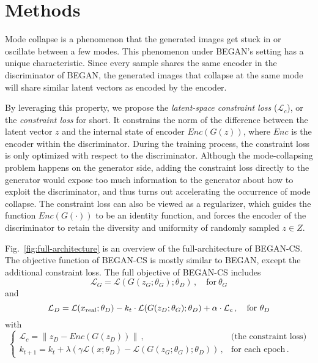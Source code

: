 \documentclass[runningheads]{llncs}
\begin{document}
\section{Methods}

    Mode collapse is a phenomenon that the generated images get stuck in or oscillate between a few modes. This phenomenon under BEGAN's setting has a unique characteristic. Since every sample shares the same encoder in the discriminator of BEGAN, the generated images that collapse at the same mode will share similar latent vectors as encoded by the encoder.
    
    By leveraging this property, we propose the \emph{latent-space constraint loss} ($\mathcal{L}_c$), or the \emph{constraint loss} for short. It constrains the norm of the difference between the latent vector $z$ and the internal state of encoder $Enc(G(z))$, where $Enc$ is the encoder within the discriminator. During the training process, the constraint loss is only optimized with respect to the discriminator. Although the mode-collapsing problem happens on the generator side, adding the constraint loss directly to the generator would expose too much information to the generator about how to exploit the discriminator, and thus turns out accelerating the occurrence of mode collapse. The constraint loss can also be viewed as a regularizer, which guides the function $Enc(G(\cdot))$ to be an identity function, and forces the encoder of the discriminator to retain the diversity and uniformity of randomly sampled $z \in Z$.
    
    
    Fig.~\ref{fig:full-architecture} is an overview of the full-architecture of BEGAN-CS. The objective function of BEGAN-CS is mostly similar to BEGAN, except the additional constraint loss. The full objective of BEGAN-CS includes
    \begin{equation}
    \mathcal{L}_G = \mathcal{L}(G(z_G;\theta_G);\theta_D)\,, \quad  \mbox{for} \ \theta_G 
    \end{equation}
\noindent and
\begin{equation}
        \mathcal{L}_D = \mathcal{L}(x_\mathrm{real};\theta_D) - k_t \cdot \mathcal{L}(G(z_D;\theta_G);\theta_D) +  \alpha \cdot \mathcal{L}_c\,, \quad \mbox{for} \ \theta_D  \\
    \end{equation}
\noindent with
\begin{equation}
    \begin{cases}     
        \mathcal{L}_c = \lVert z_D - Enc(G(z_D)) \rVert \,, & \mbox{(the constraint loss)}\\
    
        k_{t+1} = k_{t} + \lambda (\gamma \mathcal{L}(x;\theta_D) - \mathcal{L}(G(z_G;\theta_G);\theta_D) )\,, & \mbox{for each epoch} \,.
        
    \end{cases}
    \end{equation}
    
\end{document}
